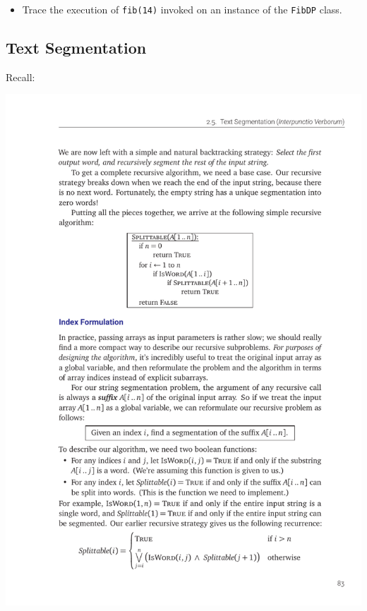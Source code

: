 \documentclass[12pt]{article}
\begin{document}
\begin{itemize}
    \item Trace the execution of \verb+fib(14)+ invoked on an instance of the \verb+FibDP+ class.
\end{itemize}

\subsection{Text Segmentation}
Recall:

\vspace{-2em}
\includegraphics{w05-splittable.pdf}
\end{document}
